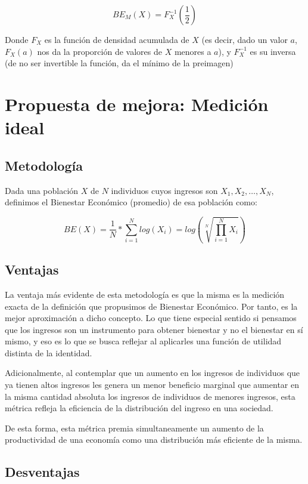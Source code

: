 $$
    BE_M(X) = F_X^{-1}(\frac{1}{2})
$$

Donde $F_X$ es la función de densidad acumulada de $X$ (es decir, dado un valor $a$, $F_X(a)$ nos da la proporción de valores de $X$ menores a $a$), y $F_X^{-1}$ es su inversa (de no ser invertible la función, da el mínimo de la preimagen)

\section{Propuesta de mejora: Medición ideal}

\subsection{Metodología}

Dada una población $X$ de $N$ individuos cuyos ingresos son $X_1, X_2, \dots, X_N$, definimos el Bienestar Económico (promedio) de esa población como:

$$
    BE(X) = \frac{1}{N} * \sum_{i=1}^N log(X_i) = log(\sqrt[N]{\prod_{i=1}^N X_i})
$$

\subsection{Ventajas}

La ventaja más evidente de esta metodología es que la misma es la medición exacta de la definición que propusimos de Bienestar Económico. Por tanto, es la mejor aproximación a dicho concepto. Lo que tiene especial sentido si pensamos que los ingresos son un instrumento para obtener bienestar y no el bienestar en sí mismo, y eso es lo que se busca reflejar al aplicarles una función de utilidad distinta de la identidad.


Adicionalmente, al contemplar que un aumento en los ingresos de individuos que ya tienen altos ingresos les genera un menor beneficio marginal que aumentar en la misma cantidad absoluta los ingresos de individuos de menores ingresos, esta métrica refleja la eficiencia de la distribución del ingreso en una sociedad.

De esta forma, esta métrica premia simultaneamente un aumento de la productividad de una economía como una distribución más eficiente de la misma.

\subsection{Desventajas}

